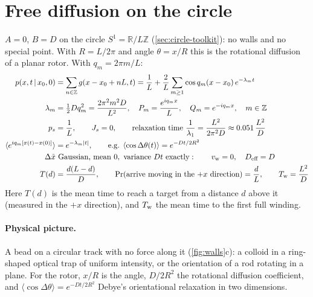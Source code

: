 \documentclass[11pt]{article}
\numberwithin{equation}{section}
\newcommand{\avg}[1]{\langle #1\rangle}
\newcommand{\given}{\,|\,}
\begin{document}
\section{Free diffusion on the circle}
\label{sec:circle}

\begin{keyresults}
$A=0$, $B=D$ on the circle $S^1=\mathbb R/L\mathbb Z$ (\cref{sec:circle-toolkit}): no walls and no special
point. With $R=L/2\pi$ and angle $\theta=x/R$ this is the rotational diffusion of a planar rotor. With
$q_m=2\pi m/L$:
\begin{align}
  p(x,t\given x_0,0) &= \sum_{n\in\mathbb Z}g(x-x_0+nL,t)
  =\frac1L+\frac2L\sum_{m\ge1}\cos q_m(x-x_0)\,e^{-\lambda_mt} \label{eq:C-prop}\\
  \lambda_m &= \tfrac12Dq_m^2=\frac{2\pi^2m^2D}{L^2},\quad P_m=\frac{e^{iq_mx}}L,\quad Q_m=e^{-iq_mx},\quad
  m\in\mathbb Z \\
  p_s &= \frac1L,\qquad J_s=0,\qquad \text{relaxation time }\frac1{\lambda_1}=\frac{L^2}{2\pi^2D}\approx0.051\,\frac{L^2}{D} \\
  \avg{e^{iq_m[x(t)-x(0)]}} &= e^{-\lambda_m|t|},\qquad\text{e.g. }\avg{\cos\Delta\theta(t)}=e^{-Dt/2R^2} \\
  \Delta\tilde x &\ \text{Gaussian, mean }0,\ \text{variance }Dt\ \text{exactly}:\qquad v_{\rm w}=0,\quad D_{\text{eff}}=D \\
  T(d) &= \frac{d(L-d)}{D},\qquad \Pr(\text{arrive moving in the }{+x}\text{ direction})=\frac dL,\qquad T_{\rm w}=\frac{L^2}D
\end{align}
Here $T(d)$ is the mean time to reach a target from a distance $d$ above it (measured in the $+x$ direction),
and $T_{\rm w}$ the mean time to the first full winding.
\end{keyresults}

\paragraph{Physical picture.} A bead on a circular track with no force along it (\cref{fig:walls}c): a colloid in
a ring-shaped optical trap of uniform intensity, or the orientation of a rod rotating in a plane. For the rotor,
$x/R$ is the angle, $D/2R^2$ the rotational diffusion coefficient, and $\avg{\cos\Delta\theta}=e^{-Dt/2R^2}$ Debye's
orientational relaxation in two dimensions.
\end{document}
